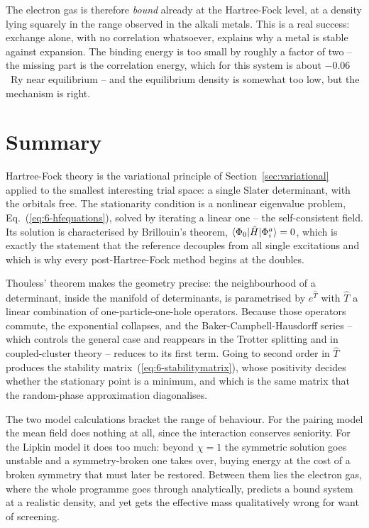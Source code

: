 The electron gas is therefore \emph{bound} already at the Hartree-Fock level,
at a density lying squarely in the range observed in the alkali metals.  This
is a real success: exchange alone, with no correlation whatsoever, explains
why a metal is stable against expansion.  The binding energy is too small by
roughly a factor of two -- the missing part is the correlation energy, which
for this system is about $-0.06$~Ry near equilibrium -- and the equilibrium
density is somewhat too low, but the mechanism is right.

\section{Summary}
\label{sec:ch6summary}

Hartree-Fock theory is the variational principle of
Section~\ref{sec:variational} applied to the smallest interesting trial space:
a single Slater determinant, with the orbitals free.  The stationarity
condition is a nonlinear eigenvalue problem,
Eq.~(\ref{eq:6-hfequations}), solved by iterating a linear one -- the
self-consistent field.  Its solution is characterised by Brillouin's theorem,
$\langle \Phi_0 | \hat{H} | \Phi_i^a \rangle=0$, which is exactly the statement that
the reference decouples from all single excitations and which is why every
post-Hartree-Fock method begins at the doubles.

Thouless' theorem makes the geometry precise: the neighbourhood of a
determinant, inside the manifold of determinants, is parametrised by
$e^{\hat{T}}$ with $\hat{T}$ a linear combination of one-particle-one-hole
operators.  Because those operators commute, the exponential collapses, and
the Baker-Campbell-Hausdorff series -- which controls the general case and
reappears in the Trotter splitting and in coupled-cluster theory -- reduces
to its first term.  Going to second order in $\hat{T}$ produces the stability
matrix~(\ref{eq:6-stabilitymatrix}), whose positivity decides whether the
stationary point is a minimum, and which is the same matrix that the
random-phase approximation diagonalises.

The two model calculations bracket the range of behaviour.  For the pairing
model the mean field does nothing at all, since the interaction conserves
seniority.  For the Lipkin model it does too much: beyond $\chi=1$ the
symmetric solution goes unstable and a symmetry-broken one takes over, buying
energy at the cost of a broken symmetry that must later be restored.  Between
them lies the electron gas, where the whole programme goes through
analytically, predicts a bound system at a realistic density, and yet gets the
effective mass qualitatively wrong for want of screening.


